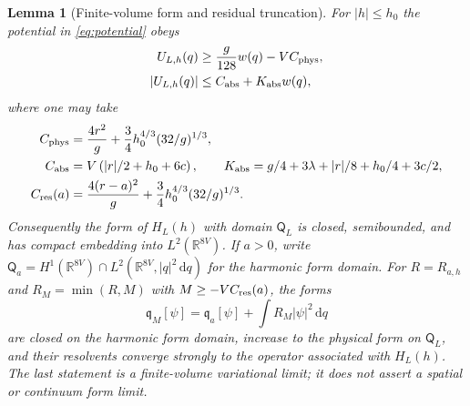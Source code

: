 \documentclass[11pt]{article}
\numberwithin{equation}{section}
\newtheorem{lemma}[theorem]{Lemma}
\theoremstyle{definition}
\newcommand{\R}{\mathbb R}
\newcommand{\dd}{\,\mathrm d}
\begin{document}
\begin{lemma}[Finite-volume form and residual truncation]
\label{lem:finite-form-truncation}
For $|h|\leq h_0$ the potential in \eqref{eq:potential} obeys
\begin{align}
 U_{L,h}(q)&\geq \frac{g}{128}w(q)-VC_{\rm phys},
 \label{eq:physical-form-lower}\\
 |U_{L,h}(q)|&\leq C_{\rm abs}+K_{\rm abs}w(q),
 \label{eq:physical-form-upper}
\end{align}
where one may take
\begin{align}
 C_{\rm phys}&=\frac{4r^2}{g}
   +\frac34h_0^{4/3}(32/g)^{1/3},\nonumber\\
 C_{\rm abs}&=V\left(|r|/2+h_0+6c\right),\qquad
 K_{\rm abs}=g/4+3\lambda+|r|/8+h_0/4+3c/2,\nonumber\\
 C_{\rm res}(a)&=\frac{4(r-a)^2}{g}
   +\frac34h_0^{4/3}(32/g)^{1/3}.
 \label{eq:form-envelope-constants}
\end{align}
Consequently the form of $H_L(h)$ with domain $\mathsf Q_L$ is closed,
semibounded, and has compact embedding into $L^2(\R^{8V})$.  If $a>0$, write
$\mathsf Q_a=H^1(\R^{8V})\cap L^2(\R^{8V},|q|^2\dd q)$ for the harmonic
form domain.  For $R=R_{a,h}$ and $R_M=\min(R,M)$ with
$M\geq-VC_{\rm res}(a)$, the forms
\[
 \mathfrak q_M[\psi]=\mathfrak q_a[\psi]
       +\int R_M|\psi|^2\dd q
\]
are closed on the harmonic form domain, increase to the physical form on
$\mathsf Q_L$, and their resolvents converge strongly to the operator
associated with $H_L(h)$.  The last statement is a finite-volume variational
limit; it does not assert a spatial or continuum form limit.
\end{lemma}
\end{document}
